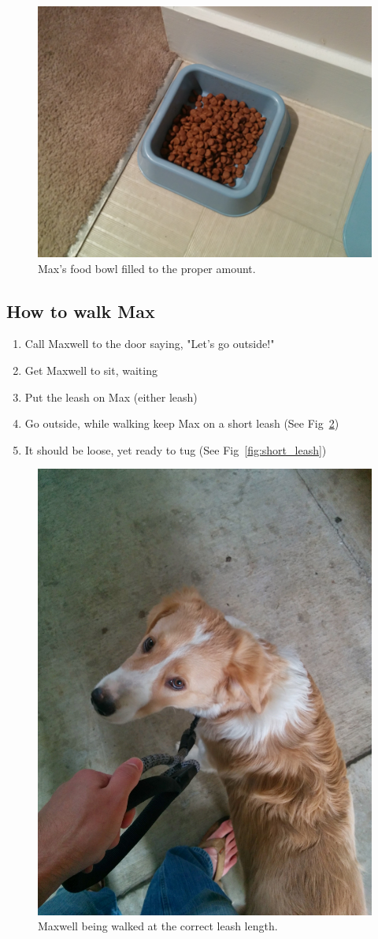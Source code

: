 \documentclass[pdftex,12pt]{article}
\begin{document}
\bigskip

\begin{figure}[h!]
    \centering
    \includegraphics[width=.35\textwidth]{./images/how_to/feed_max/food_bowl_filled.jpg}
    \caption{Max's food bowl filled to the proper amount.}
    \label{fig:food_bowl_filled}
\end{figure}

\subsection{How to walk Max}
\begin{enumerate}\label{itm:how_to_walk}
    \item Call Maxwell to the door saying, "Let's go outside!"
    \item Get Maxwell to sit, waiting
    \item Put the leash on Max (either leash)
    \item Go outside, while walking keep Max on a short leash
          (See Fig~\ref{fig:walking_max})
    \item It should be loose, yet ready to tug
          (See Fig~\ref{fig:short_leash})
\end{enumerate}

\begin{figure}[H]
    \centering
    \includegraphics[width=.35\textwidth]{./images/how_to/walk_max/walking_max.jpg}
    \caption{Maxwell being walked at the correct leash length.}
    \label{fig:walking_max}
\end{figure}
\end{document}
